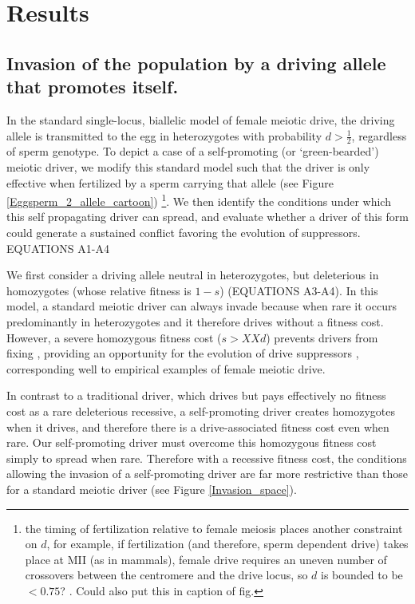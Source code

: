 \documentclass[12pt,letterpaper]{article}
\newcommand{\yb}[1]{{ \color{blue} #1}}
\begin{document}
\section*{Results}

\subsection*{ Invasion of the population by a driving allele that promotes
itself.}

In the standard single-locus, biallelic model of female meiotic drive, the driving allele is transmitted to the egg  in heterozygotes with probability  $d > \frac{1}{2}$, regardless of sperm genotype. 
To depict a case of a self-promoting (or `green-bearded') meiotic
driver,  we modify this standard model such that the driver is only effective when fertilized by a sperm carrying that allele (see Figure
\ref{Eggsperm_2_allele_cartoon}) \footnote{the timing of fertilization relative to female meiosis places another constraint on $d$, for example, if fertilization (and therefore, sperm dependent drive) takes place at MII (as in mammals),
	female drive requires an uneven number of crossovers between the centromere and the drive locus, 
	so $d$ is bounded to be $<0.75$? \citep[see ][ for discussion]{Buckler1999}. Could also put this in
        caption of fig.}.
We then identify the conditions under which this self propagating driver can spread, and evaluate whether a driver of this form could generate a sustained conflict favoring the evolution of suppressors. 
\yb{EQUATIONS A1-A4}


We first consider a driving allele neutral in heterozygotes, 
	but deleterious in homozygotes (whose relative fitness is $1-s$) \yb{(EQUATIONS A3-A4)}.  
In this model, a standard meiotic driver can always invade because 
	when rare it occurs predominantly in heterozygotes and it therefore drives without a fitness cost. 
However, a severe homozygous fitness cost ($s>XXd$) prevents  
	drivers from fixing  \citep{Prout1973}, 
	providing an opportunity for the evolution of
	drive suppressors \citep{XX}, corresponding well to 
	empirical examples of female meiotic drive. 



In contrast to a traditional driver, which drives but pays effectively
no fitness cost as a rare deleterious recessive, 
	a self-promoting driver creates homozygotes
        when it drives, and therefore there is a drive-associated fitness cost even when rare. 
Our self-promoting driver must overcome this homozygous fitness cost simply to spread when rare.
Therefore with a recessive fitness cost,
	the conditions allowing the invasion of a self-promoting driver
 	are far more restrictive than those for a standard meiotic driver (see Figure \ref{Invasion_space}).
\end{document}
